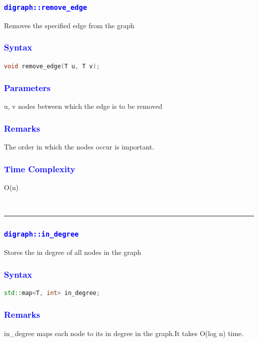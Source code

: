 \documentclass[11pt,a4paper]{article}
\begin{document}
\subsubsection*{\textcolor{blue}{\Large\texttt{digraph::remove\_edge}}}
Removes the specified edge from the graph
\subsubsection*{\textcolor{blue}{ \large {Syntax}}}
\begin{lstlisting}[language=C++]
void remove_edge(T u, T v);

\end{lstlisting}
\subsubsection*{\textcolor{blue}{ \large {Parameters}}}
u, v nodes between which the edge is to be removed


\subsubsection*{\textcolor{blue}{ \large {Remarks}}}
The order in which the nodes occur is important.


\subsubsection*{\textcolor{blue}{ \large {Time Complexity}}}
O(n)

\\
\rule{17cm}{0.1mm}

\subsubsection*{\textcolor{blue}{\Large\texttt{digraph::in\_degree}}}
Stores the in degree of all nodes in the graph
\subsubsection*{\textcolor{blue}{ \large {Syntax}}}
\begin{lstlisting}[language=C++]
std::map<T, int> in_degree;


\end{lstlisting}


\subsubsection*{\textcolor{blue}{ \large {Remarks}}}
in\_degree maps each node to its in degree in the graph.It takes O(log n) time.
\end{document}
